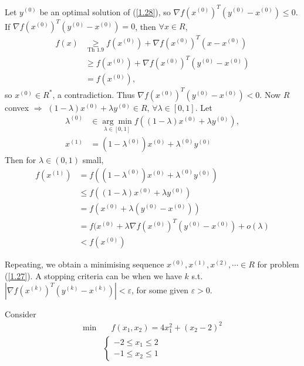 Let $y^{(0)}$ be an optimal solution of (\ref{1.28}), so $\nabla f(x^{(0)})^T(y^{(0)} - x^{(0)})\leqslant 0$. If $\nabla f(x^{(0)})^T(y^{(0)} - x^{(0)}) = 0$, then $\forall x\in R$, 
\begin{align*}
    f(x) &\underset{\text{Th 1.9}}{\geqslant} f(x^{(0)}) + \nabla f(x^{(0)})^T (x-x^{(0)}) \\
    & \geqslant f(x^{(0)}) + \nabla f(x^{(0)})^T (y^{(0)}-x^{(0)}) \\
    & = f(x^{(0)}),
\end{align*}
so $x^{(0)}\in R^*$, a contradiction. Thus $\nabla f(x^{(0)})^T(y^{(0)} - x^{(0)})<0$. Now $R$ convex $\Longrightarrow$ $(1-\lambda)x^{(0)} + \lambda y^{(0)} \in R$, $\forall \lambda\in [0, 1]$. Let
\begin{align*}
    \lambda^{(0)} &\in \underset{\lambda\in[0, 1]}{\arg\min} f\left((1-\lambda)x^{(0)} + \lambda y^{(0)}\right), \\
    x^{(1)} &= (1-\lambda^{(0)})x^{(0)} + \lambda^{(0)} y^{(0)} 
\end{align*}
Then for $\lambda\in(0, 1)$ small, 
\begin{align*}
    f(x^{(1)}) & = f\left((1-\lambda^{(0)})x^{(0)} + \lambda^{(0)} y^{(0)} \right) \\
    & \leqslant f\left((1-\lambda) x^{(0)} + \lambda y^{(0)} \right)\\
    & = f\left(x^{(0)} + \lambda(y^{(0)} - x^{(0)})\right)\\
    & = f(x^{(0)} + \lambda\nabla f(x^{(0)})^T (y^{(0)} - x^{(0)}) + o(\lambda)\\
    & < f(x^{(0)})
\end{align*}

Repeating, we obtain a minimising sequence $x^{(0)}, x^{(1)}, x^{(2)}, \cdots\in R$ for problem (\ref{1.27}). A stopping criteria can be when we have $k$ s.t. $\left|\nabla f(x^{(k)})^T(y^{(k)} - x^{(k)})\right|<\varepsilon$, for some given $\varepsilon>0$.

\begin{example}
    Consider
    \begin{align*}
        \min & \quad f(x_1, x_2) = 4x_1^2 + (x_2 - 2)^2 \\
        & \left\lbrace\begin{array}{l}
             -2\leqslant x_1\leqslant 2  \\
             -1\leqslant x_2\leqslant 1
        \end{array} \right.
    \end{align*}
\end{example}

